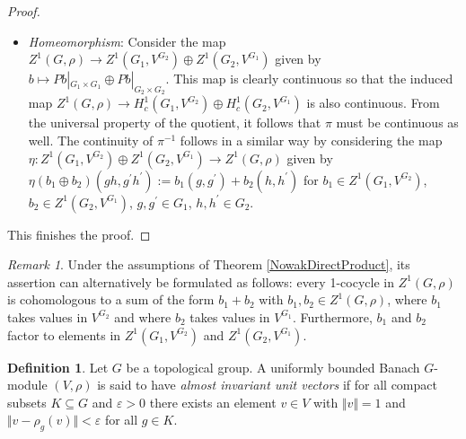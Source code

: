 \documentclass[a4paper,11pt,reqno]{amsart}
\numberwithin{equation}{section}
\theoremstyle{definition}
\newtheorem{definition}[theorem]{Definition}
\theoremstyle{remark}
\theoremstyle{remark}
\newtheorem{remark}[theorem]{Remark}
\begin{document}
\begin{proof}
\begin{itemize}
\begin{eqnarray*}
 & = & \left(b_{1}(g^{\prime},g^{\prime\prime})-b_{1}(g,g^{\prime\prime})+b_{1}(g,g^{\prime})\right)\\
 &  & +\left(b_{2}(h^{\prime},h^{\prime\prime})-b_{2}(h,h^{\prime\prime})+b_{2}(h,h^{\prime})\right)\\
 & = & 0,
\end{eqnarray*}
so that $b\in Z^{1}(G,\rho)$ with $[Pb|_{G_{1}\times G_{1}}]=[b_{1}]$, $[Pb|_{G_{2}\times G_{2}}]=[b_{2}]$. We obtain that $\pi$ is surjective. 
\item \emph{Homeomorphism}: Consider the map $Z^{1}(G,\rho)\rightarrow Z^{1}(G_{1},V^{G_{2}})\oplus Z^{1}(G_{2},V^{G_{1}})$ given by $b\mapsto Pb|_{G_{1}\times G_{1}} \oplus Pb|_{G_{2}\times G_{2}}$. This map is clearly continuous so that the induced map $Z^{1}(G,\rho)\rightarrow H_{c}^{1}(G_{1},V^{G_{2}})\oplus H_{c}^{1}(G_{2},V^{G_{1}})$ is also continuous. From the universal property of the quotient, it follows that $\pi$ must be continuous as well. The continuity of $\pi^{-1}$ follows in a similar way by considering the map $\eta:Z^{1}(G_{1},V^{G_{2}})\oplus Z^{1}(G_{2},V^{G_{1}})\rightarrow Z^{1}(G,\rho)$ given by $\eta(b_{1}\oplus b_{2})(gh,g^{\prime}h^{\prime}):=b_{1}(g,g^{\prime})+b_{2}(h,h^{\prime})$ for $b_{1}\in Z^{1}(G_{1},V^{G_{2}})$, $b_{2}\in Z^{1}(G_{2},V^{G_{1}})$, $g,g^{\prime}\in G_{1}$, $h,h^{\prime}\in G_{2}$. 
\end{itemize}
This finishes the proof. \end{proof}

\begin{remark} \label{DecompositionRemark1} Under the assumptions of Theorem \ref{NowakDirectProduct}, its assertion can alternatively be formulated as follows: every 1-cocycle in $Z^{1}(G,\rho)$ is cohomologous to a sum of the form $b_{1}+b_{2}$ with $b_{1},b_{2}\in Z^{1}(G,\rho)$, where $b_{1}$ takes values in $V^{G_{2}}$ and where $b_{2}$ takes values in $V^{G_{1}}$. Furthermore, $b_{1}$ and $b_{2}$ factor to elements in $Z^{1}(G_{1},V^{G_{2}})$ and $Z^{1}(G_{2},V^{G_{1}})$. \end{remark}

\begin{definition} Let $G$ be a topological group. A uniformly bounded Banach $G$-module $(V,\rho)$ is said to have \emph{almost invariant unit vectors} if for all compact subsets $K\subseteq G$ and $\varepsilon>0$ there exists an element $v\in V$ with $\Vert v\Vert=1$ and $\Vert v-\rho_{g}(v)\Vert<\varepsilon$ for all $g\in K$. \end{definition}
\end{document}
